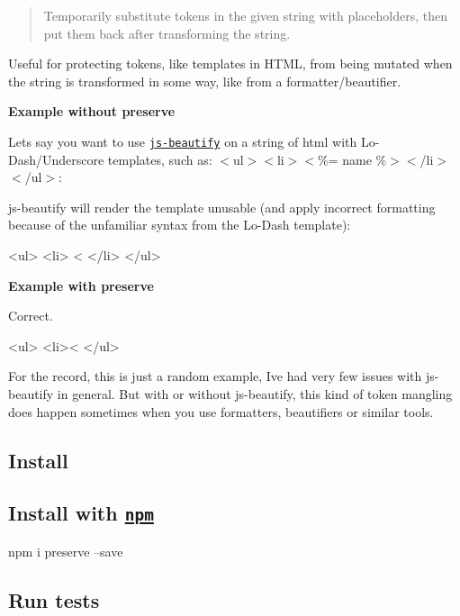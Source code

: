 \begin{quote}
Temporarily substitute tokens in the given {\ttfamily string} with placeholders, then put them back after transforming the string. \end{quote}


Useful for protecting tokens, like templates in H\+T\+ML, from being mutated when the string is transformed in some way, like from a formatter/beautifier.

{\bfseries Example without {\ttfamily preserve}}

Let\textquotesingle{}s say you want to use \href{https://github.com/beautify-web/js-beautify}{\tt js-\/beautify} on a string of html with Lo-\/\+Dash/\+Underscore templates, such as\+: {\ttfamily $<$ul$>$$<$li$>$$<$\%= name \%$>$$<$/li$>$$<$/ul$>$}\+:

js-\/beautify will render the template unusable (and apply incorrect formatting because of the unfamiliar syntax from the Lo-\/\+Dash template)\+:


\begin{DoxyCode}
<ul>
  <li>
    <%
  </li>
</ul>
\end{DoxyCode}


{\bfseries Example with {\ttfamily preserve}}

Correct.


\begin{DoxyCode}
<ul>
  <li><%
</ul>
\end{DoxyCode}


For the record, this is just a random example, I\textquotesingle{}ve had very few issues with js-\/beautify in general. But with or without js-\/beautify, this kind of token mangling does happen sometimes when you use formatters, beautifiers or similar tools.

\subsection*{Install}

\subsection*{Install with \href{npmjs.org}{\tt npm}}


\begin{DoxyCode}
npm i preserve --save
\end{DoxyCode}


\subsection*{Run tests}


